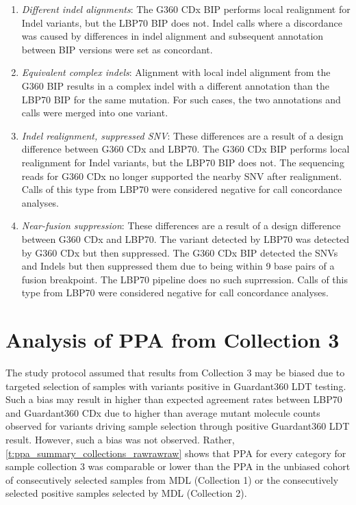 \documentclass[12pt]{protocol}
\begin{document}
\begin{appendices}
\begin{enumerate}
    \item \textit{Different indel alignments}: The G360 CDx BIP performs local realignment for
          Indel variants, but the LBP70 BIP does not. Indel calls where a discordance was caused by
          differences in indel alignment and subsequent annotation between BIP versions were set as
          concordant.
    \item \textit{Equivalent complex indels}: 
          Alignment with local indel alignment from the G360
          BIP results in a complex indel with a different annotation than the LBP70 BIP for the same
          mutation. For such cases, the two annotations and calls were merged into one variant.
    \item \textit{Indel realignment, suppressed SNV}: 
          These differences are a result of a design difference between G360 CDx and LBP70. 
          The G360 CDx BIP performs local realignment
          for Indel variants, but the LBP70 BIP does not. The sequencing reads for G360 CDx no longer
          supported the nearby SNV after realignment. Calls of this type from LBP70 were considered
          negative for call concordance analyses.
    \item \textit{Near-fusion suppression}: 
          These differences are a result of a design difference between G360 CDx 
          and LBP70. The variant detected by LBP70 was detected by G360 CDx but then suppressed. 
          The G360 CDx BIP detected the SNVs and Indels but then
          suppressed them due to being within 9 base pairs of a fusion breakpoint. The LBP70 pipeline
          does no such suprression. Calls of this type from LBP70 were considered negative for call
          concordance analyses.
\end{enumerate}

\newpage


\newpage


\newpage
\section{Analysis of PPA from Collection 3}
\label{a:conditional_concordance}

The study protocol assumed that results from Collection 3 may be biased due to targeted selection
of samples with variants positive in Guardant360 LDT testing.
Such a bias may result in higher than
expected agreement rates between LBP70 and Guardant360 CDx due to higher than average mutant
molecule counts observed for variants driving sample selection through positive Guardant360 LDT
result. However, such a bias was not observed. Rather, \cref{t:ppa_summary_collections_rawrawraw}
shows that PPA for every category for sample collection 3 was comparable or lower than the PPA in
the unbiased cohort of consecutively selected samples from MDL (Collection 1) or the consecutively
selected positive samples selected by MDL (Collection 2).


\end{appendices}
\end{document}
